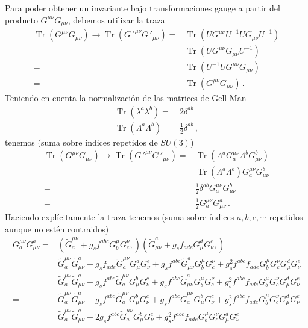 Para poder obtener un invariante bajo transformaciones gauge a partir del producto $G^{\mu\nu}G_{\mu\nu}$, debemos utilizar la traza 
\begin{align}
  \operatorname{Tr}\left(G^{\mu\nu}G_{\mu\nu}\right)\to
  \operatorname{Tr}\left({G\,'}^{\mu\nu}{G\,'}_{\mu\nu}\right)
  =&\operatorname{Tr}\left(U{{G}}^{\mu\nu}U^{-1}U{{G}}_{\mu\nu}U^{-1}\right)\nonumber\\
  =&\operatorname{Tr}\left(U{{G}}^{\mu\nu}{{G}}_{\mu\nu}U^{-1}\right)\nonumber\\
  =&\operatorname{Tr}\left(U^{-1}U{{G}}^{\mu\nu}{{G}}_{\mu\nu}\right)\nonumber\\
  =&\operatorname{Tr}\left({{G}}^{\mu\nu}{{G}}_{\mu\nu}\right)\,.
\end{align}
Teniendo en cuenta la normalización de las matrices de Gell-Man
\begin{align}
  \operatorname{Tr}\left(\lambda^a\lambda^b\right)=&2\delta^{ab}\nonumber\\
  \operatorname{Tr}\left(\Lambda^a\Lambda^b\right)=&\frac{1}{2}\delta^{ab}\,,
\end{align}
tenemos (suma sobre indices repetidos de $SU(3)$)
\begin{align}
  \operatorname{Tr}\left(G^{\mu\nu}G_{\mu\nu}\right)\to
  \operatorname{Tr}\left({G\,'}^{\mu\nu}{G\,'}_{\mu\nu}\right)
  =&\operatorname{Tr}\left(\Lambda^a{G}^{\mu\nu}_a \Lambda^b{G}_{\mu\nu}^b\right)\nonumber\\
  =&\operatorname{Tr}\left(\Lambda^a \Lambda^b\right){G}^{\mu\nu}_a {G}_{\mu\nu}^b\nonumber\\
  =&\frac{1}{2}\delta^{a b}{G}^{\mu\nu}_a {G}_{\mu\nu}^b\nonumber\\
  =&\frac{1}{2}{G}^{\mu\nu}_a {G}_{\mu\nu}^a\,.
\end{align}
Haciendo explícitamente la traza tenemos (suma sobre índices $a,b,c,\cdots$ repetidos aunque no estén contraidos)
\begin{align}
  {G}^{\mu\nu}_a {G}_{\mu\nu}^a=&
\left( \widetilde{G}^{\mu\nu}_a+g_s f^{abc}G^\mu_b G^\nu_c, \right)
\left( \widetilde{G}_{\mu\nu}^a+g_s f_{ade}G_\mu^d G_\nu^e, \right) \nonumber\\
=&\widetilde{G}^{\mu\nu}_a\widetilde{G}_{\mu\nu}^a+g_s f_{ade}\widetilde{G}^{\mu\nu}_aG_\mu^d G_\nu^e
+g_s f^{abc}\widetilde{G}_{\mu\nu}^a G^\mu_b G^\nu_c +g_s^2 f^{abc}f_{ade}G^\mu_b G^\nu_c G_\mu^d G_\nu^e 
\nonumber\\
=&\widetilde{G}^{\mu\nu}_a\widetilde{G}_{\mu\nu}^a+g_s f^{abc}\widetilde{G}^{\mu\nu}_aG_\mu^b G_\nu^c
+g_s f^{abc}\widetilde{G}_{\mu\nu}^a G^\mu_b G^\nu_c +g_s^2 f^{abc}f_{ade}G^\mu_b G^\nu_c G_\mu^d G_\nu^e 
\nonumber\\
=&\widetilde{G}^{\mu\nu}_a\widetilde{G}_{\mu\nu}^a+g_s f^{abc}\widetilde{G}^{\mu\nu}_aG_\mu^b G_\nu^c
+g_s f^{abc}\widetilde{G}^{\mu\nu}_aG_\mu^b G_\nu^c +g_s^2 f^{abc}f_{ade}G^\mu_b G^\nu_c G_\mu^d G_\nu^e 
\nonumber\\
=&\widetilde{G}^{\mu\nu}_a\widetilde{G}_{\mu\nu}^a+2g_s f^{abc}\widetilde{G}^{\mu\nu}_aG_\mu^b G_\nu^c
+g_s^2 f^{abc}f_{ade}G^\mu_b G^\nu_c G_\mu^d G_\nu^e 
\end{align}

